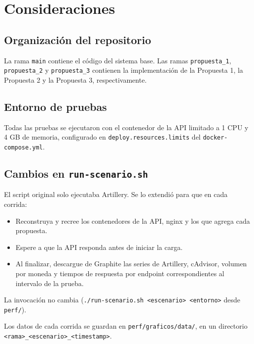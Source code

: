 \section{Consideraciones}
\label{sec:consideraciones}

    \subsection{Organización del repositorio}
    \label{sec:consideraciones_repositorio}

        La rama \texttt{main} contiene el código del sistema base. Las ramas \texttt{propuesta\_1}, \texttt{propuesta\_2} y \texttt{propuesta\_3} contienen la implementación de la Propuesta 1, la Propuesta 2 y la Propuesta 3, respectivamente.

    \subsection{Entorno de pruebas}
    \label{sec:consideraciones_entorno}

        Todas las pruebas se ejecutaron con el contenedor de la API limitado a 1 CPU y 4 GB de memoria, configurado en \texttt{deploy.resources.limits} del \texttt{docker-compose.yml}.

    \subsection{Cambios en \texttt{run-scenario.sh}}
    \label{sec:consideraciones_run_scenario}

        El script original solo ejecutaba Artillery. Se lo extendió para que en cada corrida:

    \begin{itemize}
        \item Reconstruya y recree los contenedores de la API, nginx y los que agrega cada propuesta.
        \item Espere a que la API responda antes de iniciar la carga.
        \item Al finalizar, descargue de Graphite las series de Artillery, cAdvisor, volumen por moneda y tiempos de respuesta por endpoint correspondientes al intervalo de la prueba.
    \end{itemize}

        La invocación no cambia (\texttt{./run-scenario.sh <escenario> <entorno>} desde \texttt{perf/}).

        Los datos de cada corrida se guardan en \texttt{perf/graficos/data/}, en un directorio \texttt{<rama>\_<escenario>\_<timestamp>}.

